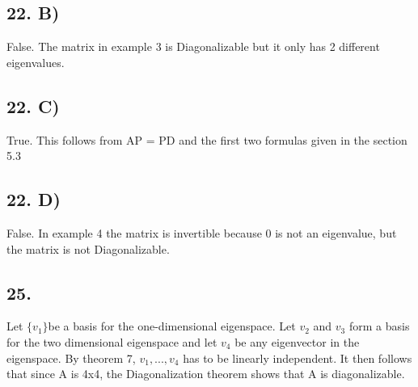 \documentclass[12]{scrartcl}
\begin{document}
\subsection*{22. B)}
False. The matrix in example 3 is Diagonalizable but it only has 2 different eigenvalues. 
\subsection*{22. C)}
True. This follows from AP = PD and the first two formulas given in the section 5.3
\subsection*{22. D)}
False. In example 4 the matrix is invertible because 0 is not an eigenvalue, but the matrix is not Diagonalizable.
\subsection*{25.}
Let $\{ v_1 \}$be a basis for the one-dimensional eigenspace. Let $v_2$ and $v_3$ form a basis for the two dimensional eigenspace and let $v_4$ be any eigenvector in the eigenspace. By theorem 7, $v_1, ... , v_4$ has to be linearly independent. It then follows that since A is 4x4, the Diagonalization theorem shows that A is diagonalizable.
\end{document}
